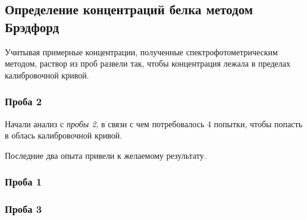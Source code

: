 \subsection{Определение концентраций белка методом Брэдфорд}

Учитывая примерные концентрации, полученные спектрофотометрическим методом,
раствор из проб развели так, чтобы концентрация лежала в пределах
калибровочной кривой.

\subsubsection{Проба 2}
Начали анализ с \emph{пробы 2}, в связи с чем потребовалось 4 попытки,
чтобы попасть в облась калибровочной кривой.

\def\svgwidth{\linewidth}
\def\svgwidth{\linewidth}
\def\svgwidth{\linewidth}
\def\svgwidth{\linewidth}

Последние два опыта привели к желаемому результату.

\subsubsection{Проба 1}
\def\svgwidth{\linewidth}

\subsubsection{Проба 3}
\def\svgwidth{\linewidth}

